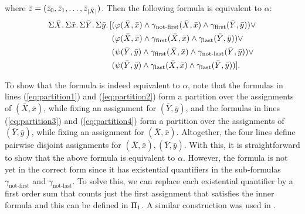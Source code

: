 where $\bar{z} = (\bar{z}_0,\bar{z}_1,\ldots,\bar{z}_{\vert \bar{X} \vert})$. Then the following formula is equivalent to $\alpha$:
\begin{align}
\Sigma{\bar{X}}.\,\Sigma{\bar{x}}.\,\Sigma{\bar{Y}}.\,\Sigma{\bar{y}}.\,[&(\varphi(\bar{X},\bar{x})\wedge\gamma_{\text{not-first}}(\bar{X},\bar{x})\wedge\gamma_{\text{first}}(\bar{Y},\bar{y}))\vee \label{eq:partition1} \\
&(\varphi(\bar{X},\bar{x})\wedge\gamma_{\text{first}}(\bar{X},\bar{x})\wedge\gamma_{\text{last}}(\bar{Y},\bar{y}))\vee \label{eq:partition2}\\
&(\psi(\bar{Y},\bar{y})\wedge\gamma_{\text{first}}(\bar{X},\bar{x})\wedge\gamma_{\text{not-last}}(\bar{Y},\bar{y}))\vee \label{eq:partition3}\\
&(\psi(\bar{Y},\bar{y})\wedge\gamma_{\text{last}}(\bar{X},\bar{x})\wedge\gamma_{\text{last}}(\bar{Y},\bar{y}))]. \label{eq:partition4}
\end{align}

To show that the formula is indeed equivalent to $\alpha$, note that the formulas in lines (\ref{eq:partition1}) and (\ref{eq:partition2}) form a partition over the assignments of $(\bar{X},\bar{x})$, while fixing an assignment for $(\bar{Y},\bar{y})$, and the formulas in lines (\ref{eq:partition3}) and (\ref{eq:partition4}) form a partition over the assignments of $(\bar{Y},\bar{y})$, while fixing an assignment for $(\bar{X},\bar{x})$. Altogether, the four lines define pairwise disjoint assignments for $(\bar{X},\bar{x}),(\bar{Y},\bar{y})$. With this, it is straightforward to show that the above formula is equivalent to $\alpha$. However, the formula is not yet in the correct form since it has existential quantifiers in the sub-formulas $\gamma_{\text{not-first}}$ and $\gamma_{\text{not-last}}$. 
To solve this, we can replace each existential quantifier by a first order sum that counts just the first assignment that satisfies the inner formula and this can be defined in $\Pi_{1}$. A similar construction was used in \cite{SalujaST95}. 

